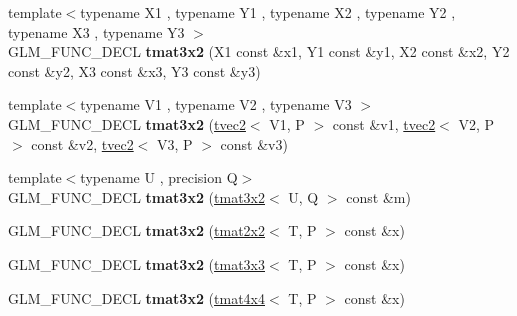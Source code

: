 \begin{DoxyCompactItemize}
\item 
{\footnotesize template$<$typename X1 , typename Y1 , typename X2 , typename Y2 , typename X3 , typename Y3 $>$ }\\G\+L\+M\+\_\+\+F\+U\+N\+C\+\_\+\+D\+E\+CL {\bfseries tmat3x2} (X1 const \&x1, Y1 const \&y1, X2 const \&x2, Y2 const \&y2, X3 const \&x3, Y3 const \&y3)\hypertarget{structglm_1_1detail_1_1tmat3x2_a775df36ef9146cd819095a1ffa971558}{}\label{structglm_1_1detail_1_1tmat3x2_a775df36ef9146cd819095a1ffa971558}

\item 
{\footnotesize template$<$typename V1 , typename V2 , typename V3 $>$ }\\G\+L\+M\+\_\+\+F\+U\+N\+C\+\_\+\+D\+E\+CL {\bfseries tmat3x2} (\hyperlink{structglm_1_1detail_1_1tvec2}{tvec2}$<$ V1, P $>$ const \&v1, \hyperlink{structglm_1_1detail_1_1tvec2}{tvec2}$<$ V2, P $>$ const \&v2, \hyperlink{structglm_1_1detail_1_1tvec2}{tvec2}$<$ V3, P $>$ const \&v3)\hypertarget{structglm_1_1detail_1_1tmat3x2_af632d84043506726bd86e34fad3a532f}{}\label{structglm_1_1detail_1_1tmat3x2_af632d84043506726bd86e34fad3a532f}

\item 
{\footnotesize template$<$typename U , precision Q$>$ }\\G\+L\+M\+\_\+\+F\+U\+N\+C\+\_\+\+D\+E\+CL {\bfseries tmat3x2} (\hyperlink{structglm_1_1detail_1_1tmat3x2}{tmat3x2}$<$ U, Q $>$ const \&m)\hypertarget{structglm_1_1detail_1_1tmat3x2_ad2448500048ef60090e4d44bedd5868c}{}\label{structglm_1_1detail_1_1tmat3x2_ad2448500048ef60090e4d44bedd5868c}

\item 
G\+L\+M\+\_\+\+F\+U\+N\+C\+\_\+\+D\+E\+CL {\bfseries tmat3x2} (\hyperlink{structglm_1_1detail_1_1tmat2x2}{tmat2x2}$<$ T, P $>$ const \&x)\hypertarget{structglm_1_1detail_1_1tmat3x2_abf0450ece5ddcb211561d3e8f2ef80d4}{}\label{structglm_1_1detail_1_1tmat3x2_abf0450ece5ddcb211561d3e8f2ef80d4}

\item 
G\+L\+M\+\_\+\+F\+U\+N\+C\+\_\+\+D\+E\+CL {\bfseries tmat3x2} (\hyperlink{structglm_1_1detail_1_1tmat3x3}{tmat3x3}$<$ T, P $>$ const \&x)\hypertarget{structglm_1_1detail_1_1tmat3x2_ade7bd106866ef9d3333332d20a52153e}{}\label{structglm_1_1detail_1_1tmat3x2_ade7bd106866ef9d3333332d20a52153e}

\item 
G\+L\+M\+\_\+\+F\+U\+N\+C\+\_\+\+D\+E\+CL {\bfseries tmat3x2} (\hyperlink{structglm_1_1detail_1_1tmat4x4}{tmat4x4}$<$ T, P $>$ const \&x)\hypertarget{structglm_1_1detail_1_1tmat3x2_a58d20ac5dcb7504ec91670e49e353f7b}{}\label{structglm_1_1detail_1_1tmat3x2_a58d20ac5dcb7504ec91670e49e353f7b}


\end{DoxyCompactItemize}
